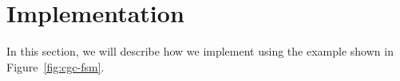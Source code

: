 \section{Implementation}
\label{sec:impl}

In this section, we will describe how we implement \Tool{} 
using the example shown in Figure~\ref{fig:cgc-fsm}. 

